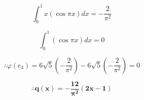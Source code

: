 \documentclass[fleqn]{article}
\begin{document}
\begin{enumerate}[nolistsep]
		\begin{equation*}
			\int_{0}^{1}{x(\cos{{\pi}x})dx} = -\frac{2}{{\pi}^2}
		\end{equation*}
		
		\begin{equation*}
			\int_{0}^{1}{(\cos{{\pi}x})dx} = 0
		\end{equation*}
		
		\begin{equation*}
			\therefore \varphi(e_3) = 6\sqrt{5}\left(-\frac{2}{{\pi}^2}\right) - 6\sqrt{5}\left(-\frac{2}{{\pi}^2}\right) = 0
		\end{equation*}
		
		\begin{equation*}
			\mathbf{\therefore q(x) = -\frac{12}{{\pi}^2}(2x - 1)}
		\end{equation*}
	\end{enumerate}
\end{document}
